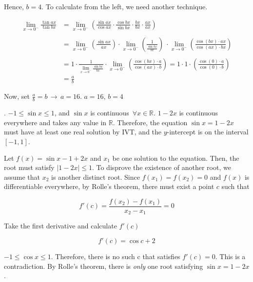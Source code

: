 \documentclass{article}
\begin{document}
\noindent Hence, $b=4$. To calculate from the left, we need another technique.

\begin{align*}
\lim_{x\to0^-} \frac{\tan ax}{\tan bx} &= \lim_{x\to0^-} \left(\frac{\sin ax}{\cos ax} \cdot \frac{\cos bx}{\sin bx} \cdot \frac{bx}{bx}\cdot \frac{ax}{ax}\right)\\\\&=\lim_{x\to0^-} \left(\frac{\sin ax}{ax} \right)\cdot \lim_{x\to0^-} \left(\frac1{ \frac{\sin bx}{bx}}\right)\ \cdot \lim_{x\to0^-} \left(\frac{\cos (bx) \cdot ax}{\cos(ax) \cdot bx}\right)\\\\&=1\cdot  \frac1{\displaystyle \lim_{x\to0^-}\frac{\sin bx}{bx}}\cdot \lim_{x\to0^-} \left(\frac{\cos (bx) \cdot a}{\cos(ax) \cdot b}\right)= 1\cdot 1\cdot\left(\frac{\cos(0) \cdot a}{\cos(0) \cdot b}\right)\\&=\frac ab
\end{align*}

\hfill

\noindent Now, set $\displaystyle \frac ab = b\,\rightarrow\, a= 16$. $\boxed{a=16,\,b=4}$

\hfill

. $-1 \leq \sin x\leq 1$, and $\sin x$ is continuous $\, \forall x\in \mathbb{R}$. $1-2x$ is continuous everywhere and takes any value in $\mathbb{R}$. Therefore, the equation $\sin x=1-2x$ must have at least one real solution by IVT, and the $y$-intercept is on the interval $[-1, 1]$.

\hfill

\noindent Let $f(x) = \sin x - 1 + 2x$ and $x_1$ be one solution to the equation. Then, the root must satisfy $|1-2x| \leq 1$. To disprove the existence of another root, we assume that $x_2$ is another distinct root. Since $f(x_1) = f(x_2) = 0$ and $f(x)$ is differentiable everywhere, by Rolle's theorem, there must exist a point $c$ such that

\[f'(c)=\frac{f(x_2)-f(x_1)}{x_2-x_1}=0\]

\hfill

\noindent Take the first derivative and calculate $f'(c)$

\[f'(c)=\cos c+2\]

\hfill

\noindent $-1\leq\cos x\leq 1$. Therefore, there is no such c that satisfies $f'(c) = 0$. This is a contradiction. By Rolle's theorem, there is \textit{only} one root satisfying $\sin x = 1-2x$.
\end{document}
